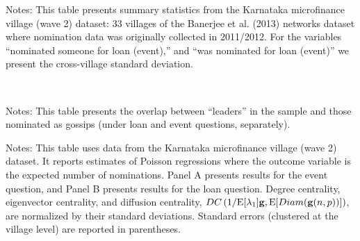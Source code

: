 \documentclass[12pt, oneside]{amsart}
\numberwithin{equation}{section}
\providecommand{\E}{\mathrm{E}}
\providecommand{\g}{{\bf g}}
\begin{document}
		

\clearpage



\begin{table}[!h]
\centering
\caption{Summary Statistics\label{tab:summary}}
\begin{threeparttable}

\begin{tablenotes}
Notes: This table presents summary statistics from the Karnataka microfinance village (wave 2) dataset: 33 villages of the Banerjee et al. (2013) networks dataset where nomination data was originally collected in 2011/2012. For the variables ``nominated someone for loan (event),'' and ``was nominated for loan (event)'' we present the cross-village standard deviation.
\end{tablenotes}
\end{threeparttable}
\end{table}

\

\begin{table}[!h]
\centering
\caption{Leader Gossip Overlap} \label{tab:overlap}
\begin{threeparttable}

\begin{tablenotes}
Notes: This table presents the overlap between ``leaders'' in the sample and those nominated as gossips (under loan and event questions, separately).
\end{tablenotes}
\end{threeparttable}
\end{table}




\clearpage



\begin{table}[!h]
\centering
\caption{Factors predicting nominations}\label{tab:predict1}
\begin{threeparttable}
\scalebox{0.8}{}
\scalebox{0.8}{}
\begin{tablenotes}
Notes: This table uses data from the Karnataka microfinance village (wave 2) dataset. It reports estimates of Poisson regressions where the outcome variable is the expected number of nominations. Panel A presents results for the event question, and Panel B presents results for the loan question.  
Degree centrality, eigenvector centrality, and diffusion centrality, $DC\left(1/\E[\lambda_1]\g,\E[Diam(\g(n,p))]\right)$, are normalized by their standard deviations. Standard errors (clustered at the village level) are reported in parentheses.
\end{tablenotes}
\end{threeparttable}
\end{table}
\end{document}
